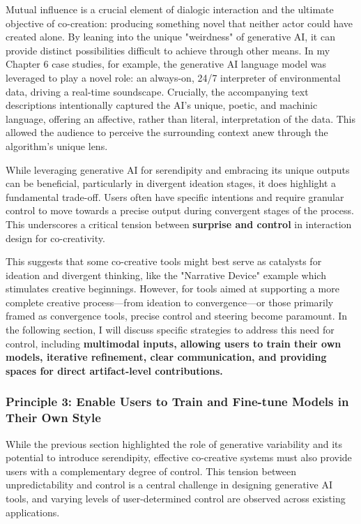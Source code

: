 Mutual influence is a crucial element of dialogic interaction and the ultimate objective of co-creation: producing something novel that neither actor could have created alone. By leaning into the unique "weirdness" of generative AI, it can provide distinct possibilities difficult to achieve through other means. In my Chapter 6 case studies, for example, the generative AI language model was leveraged to play a novel role: an always-on, 24/7 interpreter of environmental data, driving a real-time soundscape. Crucially, the accompanying text descriptions intentionally captured the AI's unique, poetic, and machinic language, offering an affective, rather than literal, interpretation of the data. This allowed the audience to perceive the surrounding context anew through the algorithm's unique lens.

While leveraging generative AI for serendipity and embracing its unique outputs can be beneficial, particularly in divergent ideation stages, it does highlight a fundamental trade-off. Users often have specific intentions and require granular control to move towards a precise output during convergent stages of the process. This underscores a critical tension between \textbf{surprise and control} in interaction design for co-creativity.

This suggests that some co-creative tools might best serve as catalysts for ideation and divergent thinking, like the "Narrative Device" example which stimulates creative beginnings. However, for tools aimed at supporting a more complete creative process—from ideation to convergence—or those primarily framed as convergence tools, precise control and steering become paramount. In the following section, I will discuss specific strategies to address this need for control, including \textbf{multimodal inputs, allowing users to train their own models, iterative refinement, clear communication, and providing spaces for direct artifact-level contributions.}

\subsubsection{Principle 3: Enable Users to Train and Fine-tune Models in Their Own Style}

While the previous section highlighted the role of generative variability and its potential to introduce serendipity, effective co-creative systems must also provide users with a complementary degree of control. This tension between unpredictability and control is a central challenge in designing generative AI tools, and varying levels of user-determined control are observed across existing applications.

